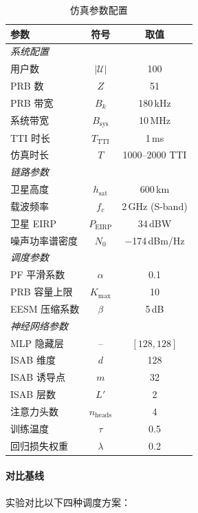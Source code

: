 \documentclass[type=master]{fduthesis}
\begin{document}
\begin{table}[t]
\centering
\caption{仿真参数配置}
\label{tab:ch4_sim_params}
\begin{tabular}{lcc}
\toprule
\textbf{参数} & \textbf{符号} & \textbf{取值} \\
\midrule
\multicolumn{3}{l}{\textit{系统配置}} \\
用户数 & $|\mathcal{U}|$ & 100 \\
PRB 数 & $Z$ & 51 \\
PRB 带宽 & $B_k$ & 180\,kHz \\
系统带宽 & $B_{\text{sys}}$ & 10\,MHz \\
TTI 时长 & $T_{\text{TTI}}$ & 1\,ms \\
仿真时长 & $T$ & 1000--2000 TTI \\
\midrule
\multicolumn{3}{l}{\textit{链路参数}} \\
卫星高度 & $h_{\text{sat}}$ & 600\,km \\
载波频率 & $f_c$ & 2\,GHz (S-band) \\
卫星 EIRP & $P_{\text{EIRP}}$ & 34\,dBW \\
噪声功率谱密度 & $N_0$ & $-$174\,dBm/Hz \\
\midrule
\multicolumn{3}{l}{\textit{调度参数}} \\
PF 平滑系数 & $\alpha$ & 0.1 \\
PRB 容量上限 & $K_{\max}$ & 10 \\
EESM 压缩系数 & $\beta$ & 5\,dB \\
\midrule
\multicolumn{3}{l}{\textit{神经网络参数}} \\
MLP 隐藏层 & -- & $[128, 128]$ \\
ISAB 维度 & $d$ & 128 \\
ISAB 诱导点 & $m$ & 32 \\
ISAB 层数 & $L'$ & 2 \\
注意力头数 & $n_{\text{heads}}$ & 4 \\
训练温度 & $\tau$ & 0.5 \\
回归损失权重 & $\lambda$ & 0.2 \\
\bottomrule
\end{tabular}
\end{table}

\paragraph{对比基线}
实验对比以下四种调度方案：
\end{document}
